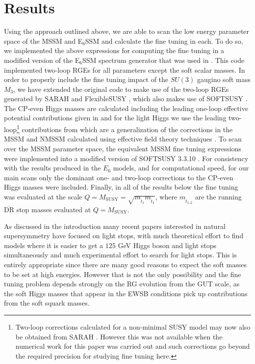\documentclass[preprint,amsmath,amssymb,aps,superscriptaddress,prd,
showpacs,floatfix,nofootinbib]{revtex4-1}
\begin{document}
\section{\label{sec:results}Results}

Using the approach outlined above, we are able to scan the low energy
parameter space of the MSSM and E$_6$SSM and calculate the fine tuning
in each.  To do so, we implemented the above expressions for computing
the fine tuning in a modified version of the E$_6$SSM spectrum
generator that was used in \cite{Athron:2013ipa}.  This code
implemented two-loop RGEs for all parameters except the soft scalar
masses.  In order to properly include the fine tuning impact of the
$SU(3)$ gaugino soft mass $M_3$, we have extended the original code to
make use of the two-loop RGEs generated by SARAH \cite{Staub:2009bi,
  Staub:2010jh, Staub:2012pb, Staub:2013tta} and FlexibleSUSY
\cite{Athron:2014yba}, which also makes use of SOFTSUSY
\cite{Allanach:2001kg, Allanach:2013kza}.  The CP-even Higgs masses
are calculated including the leading one-loop effective potential
contributions given in \cite{Athron:2009bs} and for the light Higgs we
use the leading two-loop\footnote{Two-loop corrections calculated for
  a non-minimal SUSY model may now also be obtained from SARAH
  \cite{Goodsell:2014pla,Goodsell:2015ira}.  However this was not
  available when the numerical work for this paper was carried out and
  such corrections go beyond the required precision for studying fine
  tuning here.} contributions from \cite{King:2005jy} which are a
generalization of the corrections in the MSSM and NMSSM calculated
using effective field theory techniques \cite{Carena:1995wu,
  Ellwanger:1999ji}.  To scan over the MSSM parameter space, the
equivalent MSSM fine tuning expressions were implemented into a
modified version of SOFTSUSY 3.3.10 \cite{Allanach:2001kg}.  For
consistency with the results produced in the $E_6$ models, and for
computational speed, for our main scans only the dominant one- and
two-loop corrections to the CP-even Higgs masses were included.
Finally, in all of the results below the fine tuning was evaluated at
the scale $Q = M_{\textrm{SUSY}} =
\sqrt{m_{\tilde{t}_1}m_{\tilde{t}_2}}$, where $m_{\tilde{t}_{1,2}}$
are the running $\overline{\textrm{DR}}$ stop masses evaluated at $Q =
M_{\textrm{SUSY}}$.

As discussed in the introduction many recent papers interested in
natural supersymmetry have focused on light stops, with much
theoretical effort to find models where it is easier to get a $125$
GeV Higgs boson and light stops simultaneously and much experimental
effort to search for light stops.  This is entirely appropriate since
there are many good reasons to expect the soft masses to be set at
high energies.  However that is not the only possibility and the fine
tuning problem depends strongly on the RG evolution from the GUT
scale, as the soft Higgs masses that appear in the EWSB conditions
pick up contributions from the soft squark masses.
\end{document}
